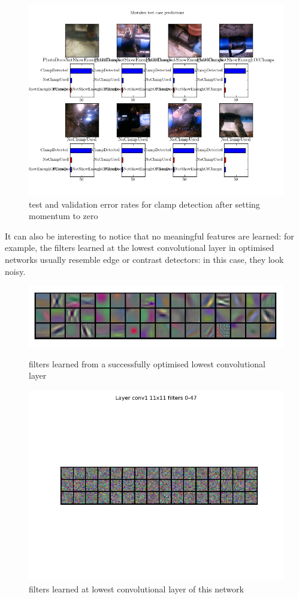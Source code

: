 \documentclass[a4paper,11pt]{article}
\begin{document}
\begin{figure}[h!]
	\centering
	\includegraphics[scale=0.5]{images/preds9.png}
	\caption{test and validation error rates for clamp detection after setting momentum to zero}
\end{figure}

It can also be interesting to notice that no meaningful features are learned: for example, the filters learned at the lowest convolutional layer in optimised networks usually resemble edge or contrast detectors: in this case, they look noisy. 

\begin{figure}[h!]
	\centering
	\includegraphics[scale=0.5]{images/good_filters.png} %
	\caption{filters learned from a successfully optimised lowest convolutional layer} 
	\includegraphics[scale=0.5]{images/bad_filters.png}  %
	\caption{filters learned at lowest convolutional layer of this network}
\end{figure}
\end{document}
